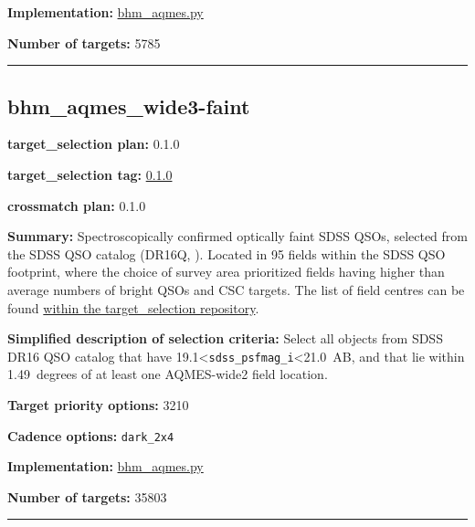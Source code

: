 \noindent\textbf{Implementation:}
\href{https://github.com/sdss/target_selection/blob/0.1.0/python/target_selection/cartons/bhm_aqmes.py}{bhm\_aqmes.py}

\noindent\textbf{Number of targets:} 5785

\begin{center}\rule{0.5\linewidth}{0.5pt}\end{center}

\hypertarget{bhm_aqmes_wide3-faint_plan0.1.0}{%
\subsection{bhm\_aqmes\_wide3-faint}\label{bhm_aqmes_wide3-faint_plan0.1.0}}

\noindent\textbf{target\_selection plan:} 0.1.0

\noindent\textbf{target\_selection tag:}
\href{https://github.com/sdss/target_selection/tree/0.1.0/}{0.1.0}

\noindent\textbf{crossmatch plan:} 0.1.0

\noindent\textbf{Summary:} Spectroscopically confirmed optically faint SDSS QSOs,
selected from the SDSS QSO catalog (DR16Q,
\citealt{Lyke2020}). Located in 95 fields within the SDSS QSO footprint,
where the choice of survey area prioritized fields having higher than
average numbers of bright QSOs and CSC targets. The list of field
centres can be found
\href{https://github.com/sdss/target_selection/blob/0.1.0/python/target_selection/masks/candidate_target_fields_bhm_aqmes_wide_v0.2.1.fits}{within
the target\_selection repository}.

\noindent\textbf{Simplified description of selection criteria:} Select all
objects from SDSS DR16 QSO catalog that have
19.1\textless{}\texttt{sdss\_psfmag\_i}\textless21.0~AB, and that lie
within 1.49~degrees of at least one AQMES-wide2 field location.


\noindent\textbf{Target priority options:} 3210

\noindent\textbf{Cadence options:} \texttt{dark\_2x4}

\noindent\textbf{Implementation:}
\href{https://github.com/sdss/target_selection/blob/0.1.0/python/target_selection/cartons/bhm_aqmes.py}{bhm\_aqmes.py}

\noindent\textbf{Number of targets:} 35803

\begin{center}\rule{0.5\linewidth}{0.5pt}\end{center}

